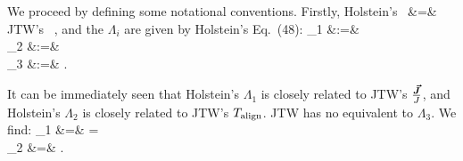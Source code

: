 
We proceed by defining some notational conventions.  Firstly, 
\bea
\textrm{Holstein's \,}  &=& \textrm{JTW's \,} ,
\label{eq:nequalsj}
\eea
and the 
$\Lambda_i$ are given by Holstein's Eq.~(48):
\bea
    \Lambda_1   &:=& \LambdaOne   
    \label{eq:lambda1} \\
    \Lambda_2   &:=& \LambdaTwo 
    \label{eq:lambda2} \\
    \Lambda_3   &:=& \LambdaThree .
    \label{eq:lambda3}
\eea

It can be immediately seen that Holstein's $\Lambda_1$ is closely related to JTW's $\frac{\bm{\vec{J}}}{J}$, and 
Holstein's $\Lambda_2$ is closely related to JTW's $T_{\mathrm{align}}$.  JTW has no equivalent to $\Lambda_3$.  We find:
\bea
\Lambda_1 \hatj &=& \LambdaOne \hatj \;\; = \;\;   \\
\Lambda_2 &=& \Talign {}.
\eea




